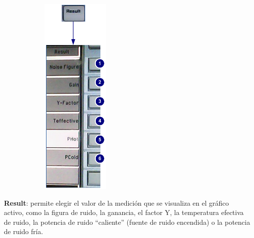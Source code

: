 	\begin{minipage}[t][10cm]{\textwidth}
		\begin{figure}		
			\includegraphics[width=0.5\textwidth, height=10cm, keepaspectratio]{./Imagenes/MenuResultN8975A.pdf}	
		\end{figure}
		
		\textbf{Result}: permite	elegir el valor de la medición que se visualiza en el gráfico activo, como la figura de ruido, la ganancia, el factor Y, la temperatura efectiva de ruido, la potencia de ruido “caliente” (fuente de ruido encendida) o la potencia de ruido fría.
	\end{minipage}



	
